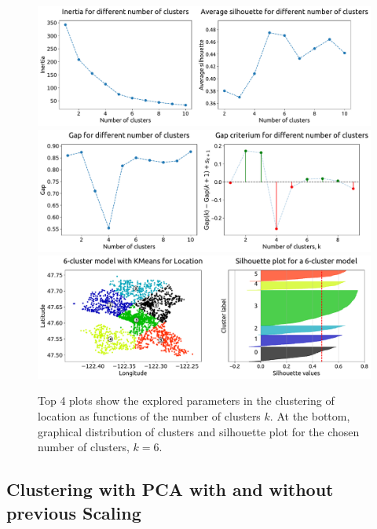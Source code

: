 \documentclass[12pt,a4paper]{article}
\begin{document}
\begin{figure}[ht!]
\centering
\includegraphics[width=\textwidth]{figs/loc_parfigs_1.pdf}
\includegraphics[width=\textwidth]{figs/loc_parfigs_2.pdf}
\includegraphics[width=\textwidth]{figs/loc_clusfigs_6_cluster.pdf}
\caption{Top 4 plots show the explored parameters in the clustering of location as functions of the number of clusters $k$. At the bottom, graphical distribution of clusters and silhouette plot for the chosen number of clusters, $k = 6$.}
\label{loc_parfigs}
\end{figure}

\clearpage

\subsection{Clustering with PCA with and without previous Scaling}
\end{document}
